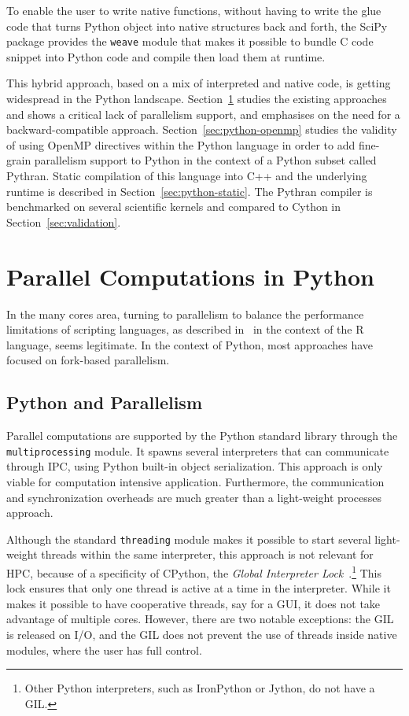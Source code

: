 \documentclass{llncs}
\begin{document}
To enable the user to write native functions, without having to write the glue
code that turns Python object into native structures back and forth, the SciPy
package provides the \texttt{weave} module that makes it possible to bundle C
code snippet into Python code and compile then load them at runtime.

This hybrid approach, based on a mix of interpreted and native code, is getting
widespread in the Python landscape. Section~\ref{sec:python-parallel} studies
the existing approaches and shows a critical lack of parallelism support, and
emphasises on the need for a backward-compatible approach.
Section~\ref{sec:python-openmp} studies the validity of using OpenMP directives
within the Python language in order to add fine-grain parallelism support to
Python in the context of a Python subset called Pythran. Static compilation of
this language into C++ and the underlying runtime is described in
Section~\ref{sec:python-static}. The Pythran compiler is benchmarked on several
scientific kernels and compared to Cython in Section~\ref{sec:validation}.

\section{Parallel Computations in Python}\label{sec:python-parallel}

In the many cores area, turning to parallelism to balance the performance
limitations of scripting languages, as described 
in~\cite{mals07} in the context of the R language, seems legitimate. In the
context of Python, most approaches have focused on fork-based parallelism.

\subsection{Python and Parallelism}

Parallel computations are supported by the Python standard library through the
\texttt{multiprocessing} module. It spawns several interpreters that can
communicate through IPC, using Python built-in object serialization. This
approach is only viable for computation intensive application. Furthermore, the
communication and synchronization overheads are much greater than a light-weight
processes approach.

Although the standard \texttt{threading} module makes it possible to start
several light-weight threads within the same interpreter, this approach is not
relevant for HPC, because of a specificity of CPython, the \emph{Global
Interpreter Lock}~\cite{gil2012}.\footnote{Other Python interpreters, such as
IronPython or Jython, do not have a GIL.} This lock ensures that only one thread
is active at a time in the interpreter. While it makes it possible to have
cooperative threads, say for a GUI, it does not take advantage of multiple
cores.  However, there are two notable exceptions: the GIL is released on I/O,
and the GIL does not prevent the use of threads inside native modules, where the
user has full control.
\end{document}

